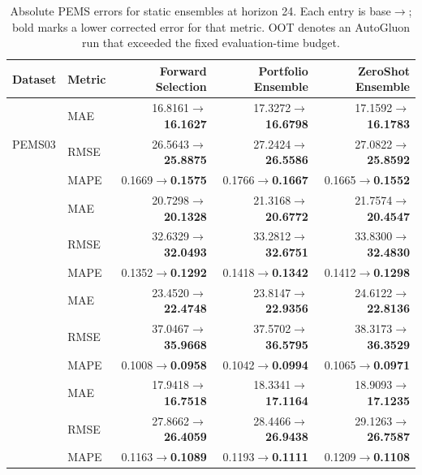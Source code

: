 \begin{table}[t]
\centering
\small
\setlength{\tabcolsep}{5pt}
\caption{Absolute PEMS errors for static ensembles at horizon 24. Each entry is base$\rightarrow$\method{}; bold marks a lower corrected error for that metric. OOT denotes an AutoGluon run that exceeded the fixed evaluation-time budget.}
\label{tab:strong-pems-absolute-ensembles}
\begin{tabular}{llrrr}
\toprule
Dataset & Metric & \shortstack{Forward\\Selection} & \shortstack{Portfolio\\Ensemble} & \shortstack{ZeroShot\\Ensemble}\\
\midrule
\multirow{3}{*}{PEMS03} & MAE & 16.8161$\rightarrow$\textbf{16.1627} & 17.3272$\rightarrow$\textbf{16.6798} & 17.1592$\rightarrow$\textbf{16.1783}\\
 & RMSE & 26.5643$\rightarrow$\textbf{25.8875} & 27.2424$\rightarrow$\textbf{26.5586} & 27.0822$\rightarrow$\textbf{25.8592}\\
 & MAPE & 0.1669$\rightarrow$\textbf{0.1575} & 0.1766$\rightarrow$\textbf{0.1667} & 0.1665$\rightarrow$\textbf{0.1552}\\
\addlinespace[1pt]
\multirow{3}{*}{PEMS04} & MAE & 20.7298$\rightarrow$\textbf{20.1328} & 21.3168$\rightarrow$\textbf{20.6772} & 21.7574$\rightarrow$\textbf{20.4547}\\
 & RMSE & 32.6329$\rightarrow$\textbf{32.0493} & 33.2812$\rightarrow$\textbf{32.6751} & 33.8300$\rightarrow$\textbf{32.4830}\\
 & MAPE & 0.1352$\rightarrow$\textbf{0.1292} & 0.1418$\rightarrow$\textbf{0.1342} & 0.1412$\rightarrow$\textbf{0.1298}\\
\addlinespace[1pt]
\multirow{3}{*}{PEMS07} & MAE & 23.4520$\rightarrow$\textbf{22.4748} & 23.8147$\rightarrow$\textbf{22.9356} & 24.6122$\rightarrow$\textbf{22.8136}\\
 & RMSE & 37.0467$\rightarrow$\textbf{35.9668} & 37.5702$\rightarrow$\textbf{36.5795} & 38.3173$\rightarrow$\textbf{36.3529}\\
 & MAPE & 0.1008$\rightarrow$\textbf{0.0958} & 0.1042$\rightarrow$\textbf{0.0994} & 0.1065$\rightarrow$\textbf{0.0971}\\
\addlinespace[1pt]
\multirow{3}{*}{PEMS08} & MAE & 17.9418$\rightarrow$\textbf{16.7518} & 18.3341$\rightarrow$\textbf{17.1164} & 18.9093$\rightarrow$\textbf{17.1235}\\
 & RMSE & 27.8662$\rightarrow$\textbf{26.4059} & 28.4466$\rightarrow$\textbf{26.9438} & 29.1263$\rightarrow$\textbf{26.7587}\\
 & MAPE & 0.1163$\rightarrow$\textbf{0.1089} & 0.1193$\rightarrow$\textbf{0.1111} & 0.1209$\rightarrow$\textbf{0.1108}\\
\bottomrule
\end{tabular}
\end{table}

